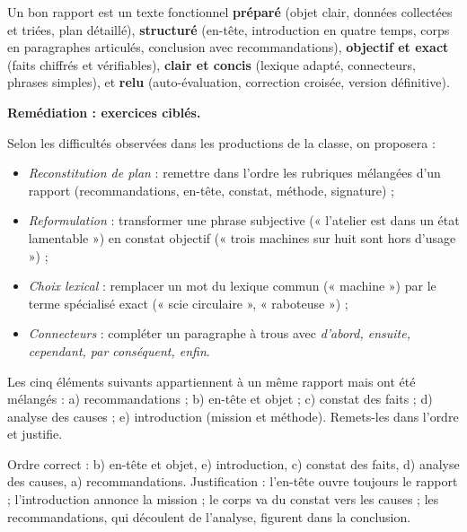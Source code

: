 \documentclass[11pt]{article}
\begin{document}
\begin{aretenir}
Un bon rapport est un texte fonctionnel \textbf{préparé} (objet clair, données collectées et triées, plan détaillé), \textbf{structuré} (en-tête, introduction en quatre temps, corps en paragraphes articulés, conclusion avec recommandations), \textbf{objectif et exact} (faits chiffrés et vérifiables), \textbf{clair et concis} (lexique adapté, connecteurs, phrases simples), et \textbf{relu} (auto-évaluation, correction croisée, version définitive).
\end{aretenir}

\textbf{Remédiation : exercices ciblés.}\par
Selon les difficultés observées dans les productions de la classe, on proposera :
\begin{itemize}
\item \emph{Reconstitution de plan} : remettre dans l'ordre les rubriques mélangées d'un rapport (recommandations, en-tête, constat, méthode, signature) ;
\item \emph{Reformulation} : transformer une phrase subjective (« l'atelier est dans un état lamentable ») en constat objectif (« trois machines sur huit sont hors d'usage ») ;
\item \emph{Choix lexical} : remplacer un mot du lexique commun (« machine ») par le terme spécialisé exact (« scie circulaire », « raboteuse ») ;
\item \emph{Connecteurs} : compléter un paragraphe à trous avec \emph{d'abord, ensuite, cependant, par conséquent, enfin}.
\end{itemize}

\begin{exercice}
Les cinq éléments suivants appartiennent à un même rapport mais ont été mélangés : a) recommandations ; b) en-tête et objet ; c) constat des faits ; d) analyse des causes ; e) introduction (mission et méthode). Remets-les dans l'ordre et justifie.
\end{exercice}

\begin{corrige}
Ordre correct : b) en-tête et objet, e) introduction, c) constat des faits, d) analyse des causes, a) recommandations. Justification : l'en-tête ouvre toujours le rapport ; l'introduction annonce la mission ; le corps va du constat vers les causes ; les recommandations, qui découlent de l'analyse, figurent dans la conclusion.
\end{corrige}
\end{document}
